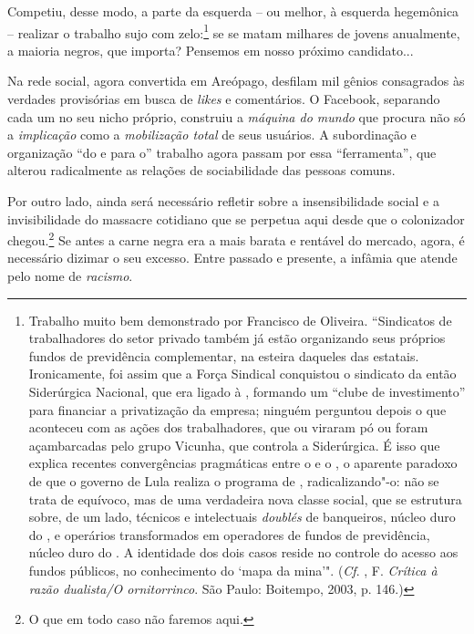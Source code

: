Competiu, desse modo, a parte da esquerda -- ou melhor, à esquerda
hegemônica -- realizar o trabalho sujo com zelo:\footnote{Trabalho muito
  bem demonstrado por Francisco de Oliveira. ``Sindicatos de
  trabalhadores do setor privado também já estão organizando seus
  próprios fundos de previdência complementar, na esteira daqueles das
  estatais. Ironicamente, foi assim que a Força Sindical conquistou o
  sindicato da então Siderúrgica Nacional, que era ligado à ,
  formando um ``clube de investimento'' para financiar a privatização da
  empresa; ninguém perguntou depois o que aconteceu com as ações dos
  trabalhadores, que ou viraram pó ou foram açambarcadas pelo grupo
  Vicunha, que controla a Siderúrgica. É isso que explica recentes
  convergências pragmáticas entre o  e o , o aparente paradoxo de
  que o governo de Lula realiza o programa de , radicalizando"-o: não
  se trata de equívoco, mas de uma verdadeira nova classe social, que se
  estrutura sobre, de um lado, técnicos e intelectuais \emph{doublés} de
  banqueiros, núcleo duro do , e operários transformados em
  operadores de fundos de previdência, núcleo duro do . A identidade
  dos dois casos reside no controle do acesso aos fundos públicos, no
  conhecimento do `mapa da mina'". (\emph{Cf}. , F. \emph{Crítica à
  razão dualista/O ornitorrinco}. São Paulo: Boitempo, 2003, p. 146.)}
se se matam milhares de jovens anualmente, a maioria negros, que
importa? Pensemos em nosso próximo candidato...

Na rede social, agora convertida em Areópago, desfilam mil gênios
consagrados às verdades provisórias em busca de \emph{likes} e
comentários. O Facebook, separando cada um no seu nicho próprio,
construiu a \emph{máquina do mundo} que procura não só a
\emph{implicação} como a \emph{mobilização total} de seus usuários. A
subordinação e organização ``do e para o'' trabalho agora passam por
essa ``ferramenta'', que alterou radicalmente as relações de
sociabilidade das pessoas comuns.

Por outro lado, ainda será necessário refletir sobre a insensibilidade
social e a invisibilidade do massacre cotidiano que se perpetua aqui
desde que o colonizador chegou.\footnote{O que em todo caso não faremos
  aqui.} Se antes a carne negra era a mais barata e rentável do
mercado, agora, é necessário dizimar o seu excesso. Entre passado e
presente, a infâmia que atende pelo nome de \emph{racismo}.

